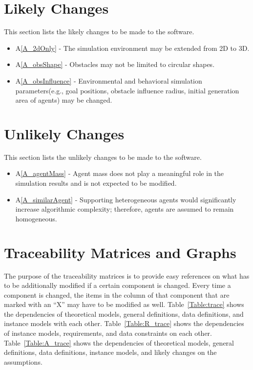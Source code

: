\documentclass[12pt]{article}
\newcommand{\aref}[1]{A\ref{#1}}
\newcounter{lcnum} %
\begin{document}
\section{Likely Changes}    

This section lists the likely changes to be made to the software.

\noindent \begin{itemize}
\item[LC\refstepcounter{lcnum}\thelcnum\label{LC_EnvChange}:]
\aref{A_2dOnly} - The simulation environment may be extended from 2D to 3D.

\item[LC\refstepcounter{lcnum}\thelcnum\label{LC_ObsShapeChange}:]
\aref{A_obsShape} - Obstacles may not be limited to circular shapes.

\item[LC\refstepcounter{lcnum}\thelcnum\label{LC_FlockingParamChange}:]
\aref{A_obsInfluence} - Environmental and behavioral simulation parameters(e.g., 
goal positions, obstacle influence radius, initial generation area of agents) 
may be changed.

\end{itemize}

\section{Unlikely Changes}    
This section lists the unlikely changes to be made to the software.
\noindent \begin{itemize}

\item[LC\refstepcounter{lcnum}\thelcnum\label{LC_NoMeanMass}:]
\aref{A_agentMass} - Agent mass does not play a meaningful role in the 
simulation results and is not expected to be modified.

\item[LC\refstepcounter{lcnum}\thelcnum\label{LC_agentHomogeneous}:]
\aref{A_similarAgent} - Supporting heterogeneous agents would significantly 
increase algorithmic complexity; therefore, agents are assumed to remain 
homogeneous.

\end{itemize}

\section{Traceability Matrices and Graphs}

The purpose of the traceability matrices is to provide easy references on what
has to be additionally modified if a certain component is changed.  Every time a
component is changed, the items in the column of that component that are marked
with an ``X'' may have to be modified as well.  Table~\ref{Table:trace} shows the
dependencies of theoretical models, general definitions, data definitions, and
instance models with each other. Table~\ref{Table:R_trace} shows the
dependencies of instance models, requirements, and data constraints on each
other. Table~\ref{Table:A_trace} shows the dependencies of theoretical models,
general definitions, data definitions, instance models, and likely changes on
the assumptions.
\end{document}
